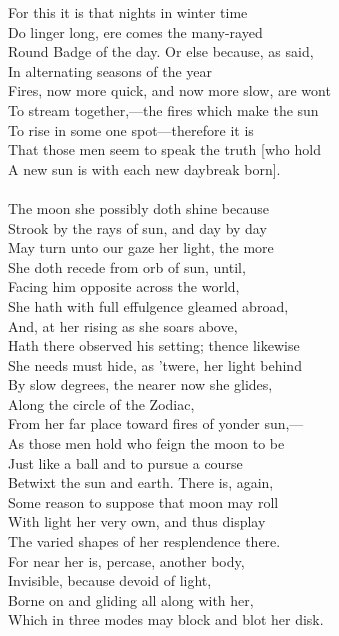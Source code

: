 For this it is that nights in winter time\\
Do linger long, ere comes the many-rayed\\
Round Badge of the day. Or else because, as said,\\
In alternating seasons of the year\\
Fires, now more quick, and now more slow, are wont\\
To stream together,—the fires which make the sun\\
To rise in some one spot—therefore it is\\
That those men seem to speak the truth [who hold\\
A new sun is with each new daybreak born].\\
\\
The moon she possibly doth shine because\\
Strook by the rays of sun, and day by day\\
May turn unto our gaze her light, the more\\
She doth recede from orb of sun, until,\\
Facing him opposite across the world,\\
She hath with full effulgence gleamed abroad,\\
And, at her rising as she soars above,\\
Hath there observed his setting; thence likewise\\
She needs must hide, as 'twere, her light behind\\
By slow degrees, the nearer now she glides,\\
Along the circle of the Zodiac,\\
From her far place toward fires of yonder sun,—\\
As those men hold who feign the moon to be\\
Just like a ball and to pursue a course\\
Betwixt the sun and earth. There is, again,\\
Some reason to suppose that moon may roll\\
With light her very own, and thus display\\
The varied shapes of her resplendence there.\\
For near her is, percase, another body,\\
Invisible, because devoid of light,\\
Borne on and gliding all along with her,\\
Which in three modes may block and blot her disk.\\
